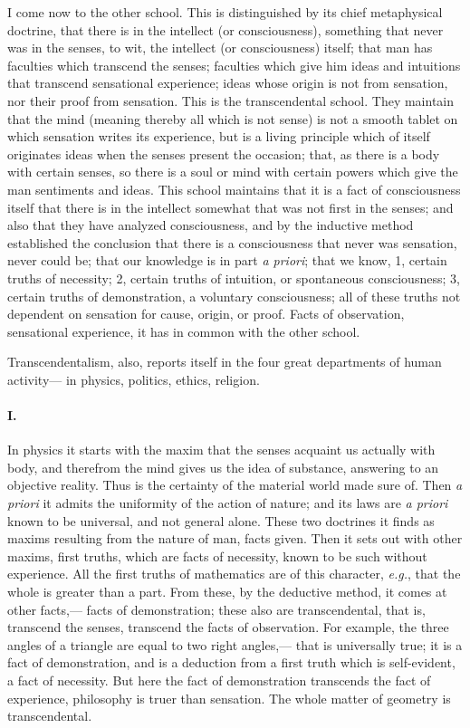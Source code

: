 \documentclass[12pt]{article}
\begin{document}
I come now to the other school. This is distinguished by its chief metaphysical doctrine, that there is in the intellect (or consciousness), something that never was in the senses, to wit, the intellect (or consciousness) itself; that man has faculties which transcend the senses; faculties which give him ideas and intuitions that transcend sensational experience; ideas whose origin is not from sensation, nor their proof from sensation. This is the transcendental school. They maintain that the mind (meaning thereby all which is not sense) is not a smooth tablet on which sensation writes its experience, but is a living principle which of itself originates ideas when the senses present the occasion; that, as there is a body with certain senses, so there is a soul or mind with certain powers which give the man sentiments and ideas. This school maintains that it is a fact of consciousness itself that there is in the intellect somewhat that was not first in the senses; and also that they have analyzed consciousness, and by the inductive method established the conclusion that there is a consciousness that never was sensation, never could be; that our knowledge is in part \emph{a priori}; that we know, 1, certain truths of necessity; 2, certain truths of intuition, or spontaneous consciousness; 3, certain truths of demonstration, a voluntary consciousness; all of these truths not dependent on sensation for cause, origin, or proof. Facts of observation, sensational experience, it has in common with the other school.


Transcendentalism, also, reports itself in the four great departments of human activity--- in physics, politics, ethics, religion. 

\paragraph{I.} In physics it starts with the maxim that the senses acquaint us actually with body, and therefrom the mind gives us the idea of substance, answering to an objective reality. Thus is the certainty of the material world made sure of. Then \emph{a priori} it admits the uniformity of the action of nature; and its laws are \emph{a priori} known to be universal, and not general alone. These two doctrines it finds as maxims resulting from the nature of man, facts given. Then it sets out with other maxims, first truths, which are facts of necessity, known to be such without experience. All the first truths of mathematics are of this character, \emph{e.g.}, that the whole is greater than a part. From these, by the deductive method, it comes at other facts,--- facts of demonstration; these also are transcendental, that is, transcend the senses, transcend the facts of observation. For example, the three angles of a triangle are equal to two right angles,--- that is universally true; it is a fact of demonstration, and is a deduction from a first truth which is self-evident, a fact of necessity. But here the fact of demonstration transcends the fact of experience, philosophy is truer than sensation. The whole matter of geometry is transcendental. 
\end{document}

